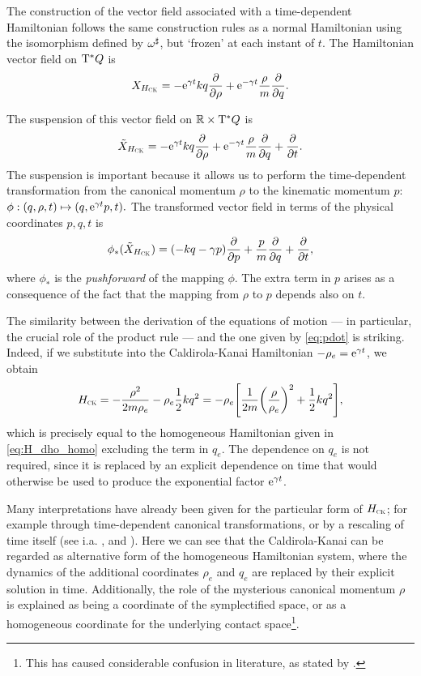 The construction of the vector field associated with a time-dependent Hamiltonian follows the same construction rules as a normal Hamiltonian using the isomorphism defined by \(\omega^\sharp\), but `frozen' at each instant of \(t\). The Hamiltonian vector field on \(\mathrm{T}^*Q\) is
\begin{equation}
     X_{H_\text{\tiny{\textsc{CK}}}} = -\mathrm{e}^{\gamma t}kq\pdv{}{\ensuremath{\rho}} + \mathrm{e}^{-\gamma t}\frac{\rho}{m}\pdv{}{q}.
\end{equation}

The suspension of this vector field on \(\mathbb{R} \times \mathrm{T}^*Q\) is
\begin{equation}
     \tilde{X}_{H_\text{\tiny{\textsc{CK}}}} = -\mathrm{e}^{\gamma t}kq\pdv{}{\ensuremath{\rho}} + \mathrm{e}^{-\gamma t}\frac{\rho}{m}\pdv{}{q} + \pdv{}{t}.
\end{equation}
The suspension is important because it allows us to perform the time-dependent transformation from the canonical momentum \(\rho\) to the kinematic momentum \(p\):
\(\phi: (q, \rho, t) \mapsto (q, \mathrm{e}^{\gamma t}p, t).\)
The transformed vector field in terms of the physical coordinates \(p, q, t\) is
\begin{equation}
     \phi_*(\tilde{X}_{H_\text{\tiny{\textsc{CK}}}}) = \qty(-kq - \gamma p)\pdv{}{p} + \frac{p}{m}\pdv{}{q} + \pdv{}{t},
\end{equation}
where $\phi_*$ is the \emph{pushforward} of the mapping $\phi$. The extra term in \(p\) arises as a consequence of the fact that the mapping from \(\rho\) to \(p\) depends also on \(t\). 

The similarity between the derivation of the equations of motion --- in particular, the crucial role of the product rule --- and the one given by \cref{eq:pdot} is striking. Indeed, if we substitute into the Caldirola-Kanai Hamiltonian \(-\rho_e = \mathrm{e}^{\gamma t}\), we obtain
\begin{equation}
     H_\text{\tiny{\textsc{CK}}} = -\frac{\rho^2}{2m\rho_e} - \rho_e \frac{1}{2}kq^2 = -\rho_e \qty[\frac{1}{2m}\qty(\frac{\rho}{\rho_e})^2 + \frac{1}{2}kq^2],
\end{equation}
which is precisely equal to the homogeneous Hamiltonian given in \cref{eq:H_dho_homo} excluding the term in \(q_e\). The dependence on \(q_e\) is not required, since it is replaced by an explicit dependence on time that would otherwise be used to produce the exponential factor \(\mathrm{e}^{\gamma t}\). 

Many interpretations have already been given for the particular form of \(H_\text{\tiny{\textsc{CK}}}\); for example through time-dependent canonical transformations, or by a rescaling of time itself (see i.a. \citet{Tokieda2021}, \citet{Caldirola1941} and \citet{Bravetti2017}). Here we can see that the Caldirola-Kanai can be regarded as alternative form of the homogeneous Hamiltonian system, where the dynamics of the additional coordinates \(\rho_e\) and \(q_e\) are replaced by their explicit solution in time. Additionally, the role of the mysterious canonical momentum \(\rho\) is explained as being a coordinate of the symplectified space, or as a homogeneous coordinate for the underlying contact space\footnote{This has caused considerable confusion in literature, as stated by \citet{Schuch1997}.}.

